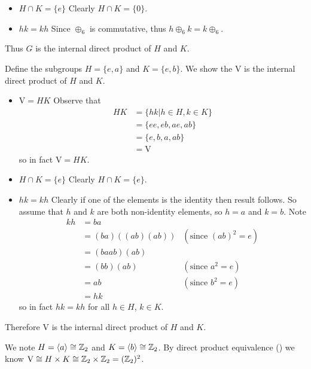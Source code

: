 \begin{questions}
\begin{itemize}
        \item $\boxed{H \cap K = \{e\}}$ Clearly $H \cap K = \{0\}$.

        \item $\boxed{hk = kh}$ Since $\oplus_6$ is commutative, thus $h \oplus_6 k = k \oplus_6$.
    \end{itemize}
    Thus $G$ is the internal direct product of $H$ and $K$.

    \item Define the subgroups $H = \{e, a\}$ and $K = \{e, b\}$. We show the $\mathrm{V}$ is the internal direct product of $H$ and $K$.
    \begin{itemize}
        \item $\boxed{\mathrm{V} = HK}$ Observe that
        \begin{align*}
            HK &= \{hk \vert h \in H, k \in K\}\\
            &= \{ee, eb, ae, ab\}\\
            &= \{e, b, a, ab\}\\
            &= \mathrm{V}
        \end{align*}
        so in fact $\mathrm{V} = HK$.

        \item $\boxed{H \cap K = \{e\}}$ Clearly $H \cap K = \{e\}$.

        \item $\boxed{hk = kh}$ Clearly if one of the elements is the identity then result follows. So assume that $h$ and $k$ are both non-identity elements, so $h = a$ and $k = b$. Note
        \begin{align*}
            kh &= ba\\
            &= (ba)\left((ab)(ab)\right) & (\text{since }(ab)^2 = e)\\
            &= (ba ab)(ab)\\
            &= (bb)(ab) & (\text{since }a^2 = e)\\
            &= ab & (\text{since }b^2 = e)\\
            &= hk
        \end{align*}
        so in fact $hk = kh$ for all $h \in H$, $k \in K$.
    \end{itemize}
    Therefore $\mathrm{V}$ is the internal direct product of $H$ and $K$.

    We note $H = \langle a\rangle \cong \mathbb{Z}_2$ and $K = \langle b \rangle \cong \mathbb{Z}_2$. By direct product equivalence () we know $\mathrm{V} \cong H \times K \cong \mathbb{Z}_2 \times \mathbb{Z}_2 = (\mathbb{Z}_2)^2$.
\end{questions}
